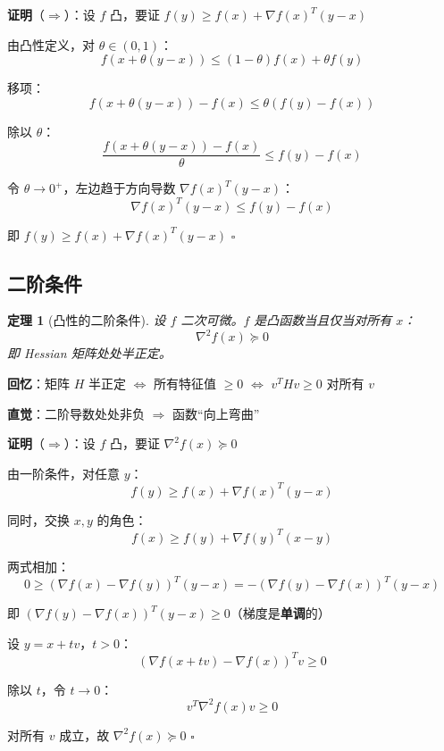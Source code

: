 \documentclass[12pt, a4paper]{ctexart}
\newtheorem{theorem}{定理}[section]
\begin{document}
\begin{blackboard}

\textbf{证明}（$\Rightarrow$）：设 $f$ 凸，要证 $f(y) \geq f(x) + \nabla f(x)^T(y-x)$

由凸性定义，对 $\theta \in (0,1)$：
\[
f(x + \theta(y-x)) \leq (1-\theta) f(x) + \theta f(y)
\]

移项：
\[
f(x + \theta(y-x)) - f(x) \leq \theta (f(y) - f(x))
\]

除以 $\theta$：
\[
\frac{f(x + \theta(y-x)) - f(x)}{\theta} \leq f(y) - f(x)
\]

令 $\theta \to 0^+$，左边趋于方向导数 $\nabla f(x)^T(y-x)$：
\[
\nabla f(x)^T(y-x) \leq f(y) - f(x)
\]

即 $f(y) \geq f(x) + \nabla f(x)^T(y-x)$ \hfill $\square$

\end{blackboard}

\subsection{二阶条件}

\begin{blackboard}

\begin{theorem}[凸性的二阶条件]
设 $f$ 二次可微。$f$ 是凸函数当且仅当对所有 $x$：
\[
\nabla^2 f(x) \succeq 0
\]
即 Hessian 矩阵处处半正定。
\end{theorem}

\textbf{回忆}：矩阵 $H$ 半正定 $\Leftrightarrow$ 所有特征值 $\geq 0$ $\Leftrightarrow$ $v^T H v \geq 0$ 对所有 $v$

\textbf{直觉}：二阶导数处处非负 $\Rightarrow$ 函数``向上弯曲''

\end{blackboard}

\begin{blackboard}

\textbf{证明}（$\Rightarrow$）：设 $f$ 凸，要证 $\nabla^2 f(x) \succeq 0$

由一阶条件，对任意 $y$：
\[
f(y) \geq f(x) + \nabla f(x)^T(y-x)
\]

同时，交换 $x, y$ 的角色：
\[
f(x) \geq f(y) + \nabla f(y)^T(x-y)
\]

两式相加：
\[
0 \geq (\nabla f(x) - \nabla f(y))^T(y-x) = -(\nabla f(y) - \nabla f(x))^T(y-x)
\]

即 $(\nabla f(y) - \nabla f(x))^T(y-x) \geq 0$（梯度是\textbf{单调}的）

设 $y = x + tv$，$t > 0$：
\[
(\nabla f(x+tv) - \nabla f(x))^T v \geq 0
\]

除以 $t$，令 $t \to 0$：
\[
v^T \nabla^2 f(x) v \geq 0
\]

对所有 $v$ 成立，故 $\nabla^2 f(x) \succeq 0$ \hfill $\square$

\end{blackboard}
\end{document}
